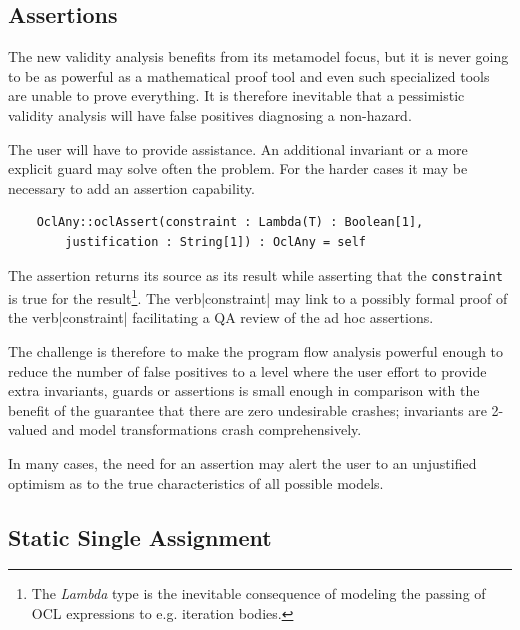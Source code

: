 \documentclass{llncs}
\begin{document}

\subsection{Assertions}

The new validity analysis benefits from its metamodel focus, but it is never going to be as powerful as a mathematical proof tool and even such specialized tools are unable to prove everything. It is therefore inevitable that a pessimistic validity analysis will have false positives diagnosing a non-hazard. 

The user will have to provide assistance. An additional invariant or a more explicit guard may solve often the problem. For the harder cases it may be necessary to add an assertion capability.

\begin{verbatim}
    OclAny::oclAssert(constraint : Lambda(T) : Boolean[1],
        justification : String[1]) : OclAny = self
\end{verbatim}

The assertion returns its source as its result while asserting that the \verb|constraint| is true for the result\footnote{The \emph{Lambda} type is the inevitable consequence of modeling the passing of OCL expressions to e.g. iteration bodies.}. The verb|constraint| may link to a possibly formal proof of the verb|constraint| facilitating a QA review of the ad hoc assertions.

The challenge is therefore to make the program flow analysis powerful enough to reduce the number of false positives to a level where the user effort to provide extra invariants, guards or assertions is small enough in comparison with the benefit of the guarantee that there are zero undesirable crashes; invariants are 2-valued and model transformations crash comprehensively.

In many cases, the need for an assertion may alert the user to an unjustified optimism as to the true characteristics of all possible models.

\subsection{Static Single Assignment}
\end{document}
